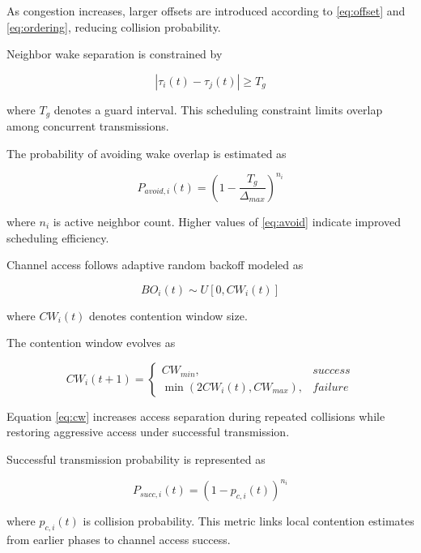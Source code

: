 \documentclass[a4paper,fleqn,final,1p]{cas-dc}
\numberwithin{equation}{section}
\begin{document}
As congestion increases, larger offsets are introduced according to \ref{eq:offset} and \ref{eq:ordering}, reducing collision probability.

Neighbor wake separation is constrained by

\begin{equation}
|\tau_i(t)-\tau_j(t)| \ge T_g
\label{eq:guard}
\end{equation}

where $T_g$ denotes a guard interval. This scheduling constraint limits overlap among concurrent transmissions.

The probability of avoiding wake overlap is estimated as

\begin{equation}
P_{avoid,i}(t)=
\left(
1-\frac{T_g}{\Delta_{max}}
\right)^{n_i}
\label{eq:avoid}
\end{equation}

where $n_i$ is active neighbor count. Higher values of \ref{eq:avoid} indicate improved scheduling efficiency.

Channel access follows adaptive random backoff modeled as

\begin{equation}
BO_i(t)\sim U[0,CW_i(t)]
\label{eq:backoff}
\end{equation}

where $CW_i(t)$ denotes contention window size.

The contention window evolves as

\begin{equation}
CW_i(t+1)=
\begin{cases}
CW_{min}, & success \\
\min(2CW_i(t),CW_{max}), & failure
\end{cases}
\label{eq:cw}
\end{equation}

Equation \ref{eq:cw} increases access separation during repeated collisions while restoring aggressive access under successful transmission.

Successful transmission probability is represented as

\begin{equation}
P_{succ,i}(t)=
(1-p_{c,i}(t))^{n_i}
\label{eq:succ}
\end{equation}

where $p_{c,i}(t)$ is collision probability. This metric links local contention estimates from earlier phases to channel access success.
\end{document}
